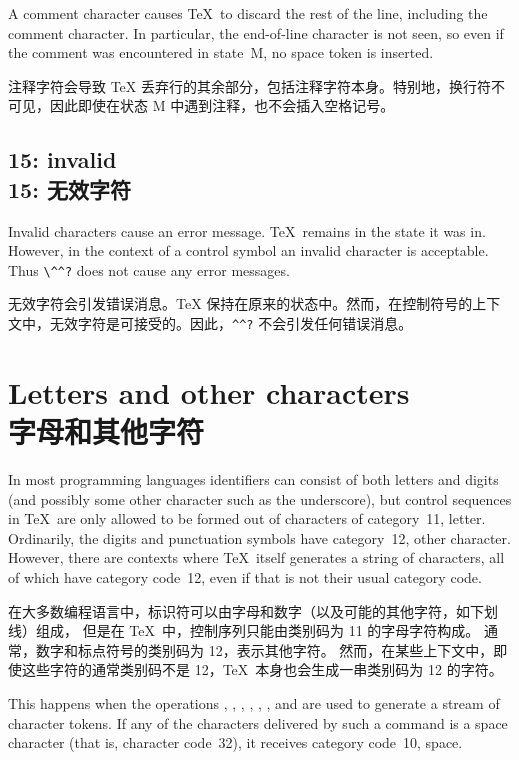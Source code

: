 A comment character causes \TeX\ to discard 
the rest of the line, including the comment character.
In particular, the end-of-line character is not seen,
so even if the comment was encountered in state~{\italic M}, no space
token is inserted.

注释字符会导致 \TeX{} 丢弃行的其余部分，包括注释字符本身。特别地，换行符不可见，因此即使在状态 {\italic M} 中遇到注释，也不会插入空格记号。
\subsection{15: invalid\\15: 无效字符}

Invalid characters cause an error message. \TeX\ remains in
the state it was in.
However, in the context of a control symbol an invalid character
is acceptable. Thus \verb>\^^?> does not cause any error messages.
\awp

无效字符会引发错误消息。\TeX{} 保持在原来的状态中。然而，在控制符号的上下文中，无效字符是可接受的。因此，\verb>^^?> 不会引发任何错误消息。



\section{Letters and other characters\\字母和其他字符}
\label{cat12}

In most programming languages identifiers can consist
of both letters and digits (and possibly some other
character such as the underscore), but control sequences in \TeX\
are only allowed to be formed out of characters of category~11,
letter. Ordinarily, the digits and punctuation symbols have
category~12, other character.
However, there are contexts where \TeX\ itself
generates a string of characters, all of which have
category code~12, even if that is not their usual
category code.

在大多数编程语言中，标识符可以由字母和数字（以及可能的其他字符，如下划线）组成，
但是在 \TeX\ 中，控制序列只能由类别码为 11 的字母字符构成。
通常，数字和标点符号的类别码为 12，表示其他字符。
然而，在某些上下文中，即使这些字符的通常类别码不是 12，\TeX\ 本身也会生成一串类别码为 12 的字符。

This happens when the operations 
,
,
,
,
,
,
and 
are used to generate a stream of character tokens.
If any of the characters delivered by such a command
is a space character (that is, character code~32), 
it receives category code~10, space.

